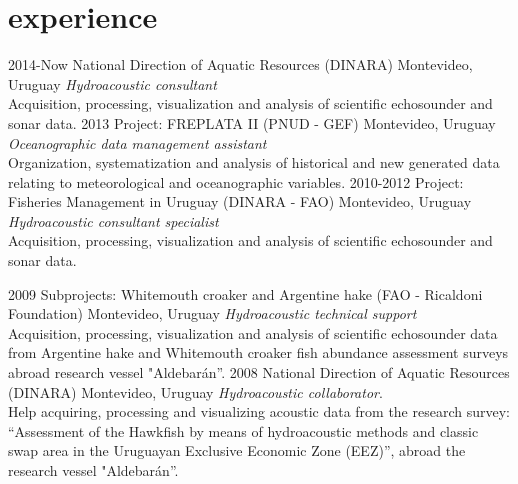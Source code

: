 \documentclass[]{friggeri-cv} %
\begin{document}
\section{experience}
\begin{entrylist}

\entry
{2014-Now}
{National Direction of Aquatic Resources (DINARA)}
{Montevideo, Uruguay}
{\emph{Hydroacoustic consultant} \\ Acquisition, processing, visualization and analysis of scientific echosounder and sonar data.}
\entry
{2013}
{Project: FREPLATA II (PNUD - GEF)}
{Montevideo, Uruguay}
{\emph{Oceanographic data management assistant} \\ Organization, systematization and analysis of historical and new generated data relating to meteorological and oceanographic variables.}
\entry
{2010-2012}
{Project: Fisheries Management in Uruguay (DINARA - FAO)}
{Montevideo, Uruguay}
{\emph{Hydroacoustic consultant specialist} \\Acquisition, processing, visualization and analysis of scientific echosounder and sonar data.}
\end{entrylist}

\begin{entrylist}
\entry
{2009}
{Subprojects: Whitemouth croaker and Argentine hake (FAO - Ricaldoni Foundation)}
{Montevideo, Uruguay}
{\emph{Hydroacoustic technical support}\\Acquisition, processing, visualization and analysis of scientific echosounder data from Argentine hake and Whitemouth croaker fish abundance assessment surveys abroad research vessel "Aldebarán''.}
\entry
{2008}
{National Direction of Aquatic Resources (DINARA)}
{Montevideo, Uruguay}
{\emph{Hydroacoustic collaborator}. \\ Help acquiring, processing and visualizing acoustic data from the research survey: ``Assessment of the Hawkfish by means of hydroacoustic methods and classic swap area in the Uruguayan Exclusive Economic Zone (EEZ)'', abroad the research vessel "Aldebarán''.}
\end{entrylist}
\end{document}
